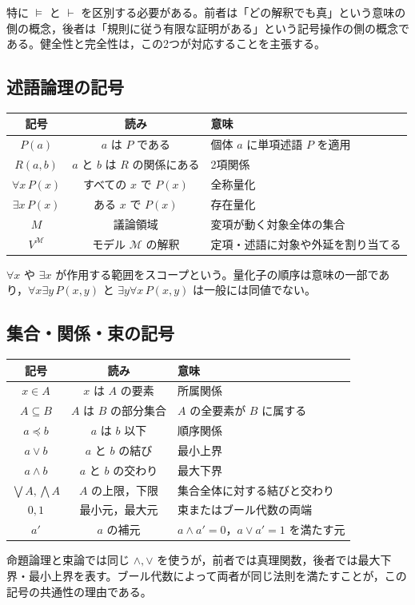 \documentclass[../main.tex]{subfiles}
\begin{document}
特に \(\vDash\) と \(\vdash\) を区別する必要がある。前者は「どの解釈でも真」という意味の側の概念，後者は「規則に従う有限な証明がある」という記号操作の側の概念である。健全性と完全性は，この2つが対応することを主張する。

\subsection*{述語論理の記号}

\begin{center}
  \begin{tabular}{ccl}
    \hline
    記号 & 読み & 意味 \\
    \hline
    \(P(a)\) & \(a\) は \(P\) である & 個体 \(a\) に単項述語 \(P\) を適用 \\
    \(R(a,b)\) & \(a\) と \(b\) は \(R\) の関係にある & 2項関係 \\
    \(\forall x\,P(x)\) & すべての \(x\) で \(P(x)\) & 全称量化 \\
    \(\exists x\,P(x)\) & ある \(x\) で \(P(x)\) & 存在量化 \\
    \(M\) & 議論領域 & 変項が動く対象全体の集合 \\
    \(V^{\mathcal M}\) & モデル \(\mathcal M\) の解釈 & 定項・述語に対象や外延を割り当てる \\
    \hline
  \end{tabular}
\end{center}

\(\forall x\) や \(\exists x\) が作用する範囲をスコープという。量化子の順序は意味の一部であり，\(\forall x\exists y\,P(x,y)\) と \(\exists y\forall x\,P(x,y)\) は一般には同値でない。

\subsection*{集合・関係・束の記号}

\begin{center}
  \begin{tabular}{ccl}
    \hline
    記号 & 読み & 意味 \\
    \hline
    \(x\in A\) & \(x\) は \(A\) の要素 & 所属関係 \\
    \(A\subseteq B\) & \(A\) は \(B\) の部分集合 & \(A\) の全要素が \(B\) に属する \\
    \(a\preceq b\) & \(a\) は \(b\) 以下 & 順序関係 \\
    \(a\lor b\) & \(a\) と \(b\) の結び & 最小上界 \\
    \(a\land b\) & \(a\) と \(b\) の交わり & 最大下界 \\
    \(\bigvee A,\bigwedge A\) & \(A\) の上限，下限 & 集合全体に対する結びと交わり \\
    \(0,1\) & 最小元，最大元 & 束またはブール代数の両端 \\
    \(a'\) & \(a\) の補元 & \(a\land a'=0\)，\(a\lor a'=1\) を満たす元 \\
    \hline
  \end{tabular}
\end{center}

命題論理と束論では同じ \(\land,\lor\) を使うが，前者では真理関数，後者では最大下界・最小上界を表す。ブール代数によって両者が同じ法則を満たすことが，この記号の共通性の理由である。
\end{document}
